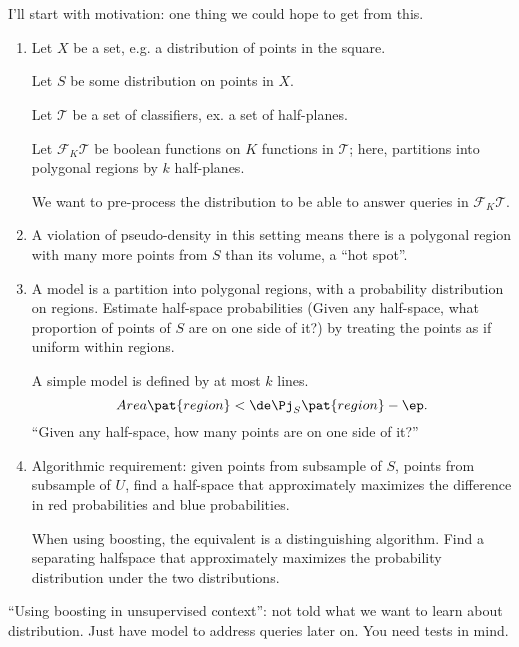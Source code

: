 \section{}




I'll start with motivation: one thing we could hope to get from this.

\begin{enumerate}
\item
Let $X$ be a set, e.g. a distribution of points in the square. %

Let $S$ be some distribution on points in $X$.

Let $\mathcal T$ be a set of classifiers, ex. a set of half-planes.

Let $\mathcal F_K\mathcal T$ be boolean functions on $K$ functions in $\mathcal T$; here, partitions into polygonal regions by $k$ half-planes.

We want to pre-process the distribution to be able to answer queries in $\mathcal F_K\mathcal T$.
\item
A violation of pseudo-density in this setting means there is a polygonal region with many more points from $S$ than its volume, a ``hot spot''.
\item
A model is a partition into polygonal regions, with a probability distribution on regions. Estimate half-space probabilities (Given any half-space, what proportion of points of $S$ are on one side of it?) by treating the points as if uniform within regions.

A simple model is defined by at most $k$ lines. 
$$
Area\pat{region}< \de \Pj_S\pat{region}-\ep.
$$
``Given any half-space, how many points are on one side of it?''
\item
Algorithmic requirement: given points from subsample of $S$, points from subsample of $U$, find a half-space that approximately maximizes the difference in red probabilities and blue probabilities.

When using boosting, the equivalent is a distinguishing algorithm.
Find a separating halfspace that approximately maximizes the probability distribution under the two distributions.

\end{enumerate}
``Using boosting in unsupervised context'': not told what we want to learn about distribution. Just have model to address queries later on. You need tests in mind. %




